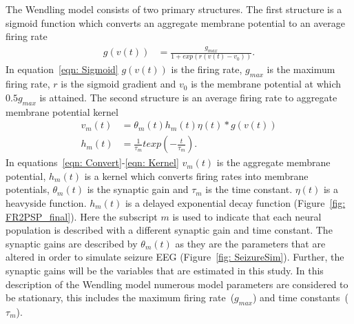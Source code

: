 The Wendling model consists of two primary structures. The first structure is a sigmoid function which converts an aggregate membrane potential to an average firing rate\begin{align}%
\label{eqn: Sigmoid}
g(v(t)) &= \frac{g_{max}}{1+exp(r(v(t)-v_{0}))}. \end{align} In equation~\ref{eqn: Sigmoid} $g(v(t))$ is the firing rate, $g_{max}$ is the maximum firing rate, $r$ is the sigmoid gradient and $v_{0}$ is the membrane potential at which $0.5g_{max}$ is attained. The second structure is an average firing rate to aggregate membrane potential kernel \begin{align} %
\label{eqn: Convert}
v_{m}(t) &= \theta_{m}(t)h_{m}(t)\eta(t)*g(v(t))\\
\label{eqn: Kernel} 
h_{m}(t) &= \frac{1}{\tau_{m}}texp\left(-\frac{t}{\tau_{m}}\right). \end{align} In equations~\ref{eqn: Convert}-\ref{eqn: Kernel} $v_{m}(t)$ is the aggregate membrane potential, $h_{m}(t)$ is a kernel which converts firing rates into membrane potentials, $\theta_{m}(t)$ is the synaptic gain and $\tau_{m}$ is the time constant. $\eta(t)$ is a heavyside function. $h_{m}(t)$ is a delayed exponential decay function (Figure~\ref{fig: FR2PSP_final}). Here the subscript $m$ is used to indicate that each neural population is described with a different synaptic gain and time constant. The synaptic gains are described by $\theta_{m}(t)$ as they are the parameters that are altered in order to simulate seizure EEG (Figure~\ref{fig: SeizureSim}). Further, the synaptic gains will be the variables that are estimated in this study. In this description of the Wendling model numerous model parameters are considered to be stationary, this includes the maximum firing rate~($g_{max}$) and time constants~($\tau_{m}$). 
